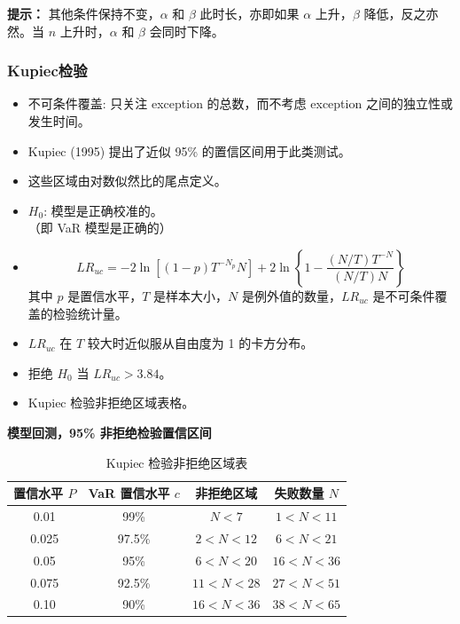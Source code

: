 \begin{itemize}
\textbf{提示：} 其他条件保持不变，\( \alpha \) 和 \( \beta \) 此时长，亦即如果 \( \alpha \) 上升，\( \beta \) 降低，反之亦然。当 \( n \) 上升时，\( \alpha \) 和 \( \beta \) 会同时下降。
    \end{itemize}

\subsubsection{Kupiec检验}
    \begin{itemize}
        \item 不可条件覆盖: 只关注 exception 的总数，而不考虑 exception 之间的独立性或发生时间。
        \item Kupiec (1995) 提出了近似 95\% 的置信区间用于此类测试。
        \item 这些区域由对数似然比的尾点定义。
        \item \( H_0 \): 模型是正确校准的。\\
        （即 VaR 模型是正确的）
        \item 
        \[
        LR_{uc} = -2\ln\left[(1 - p)T^{-N_p}N\right] + 2\ln\left\{1 - \frac{(N/T)T^{-N}}{(N/T)N}\right\}
        \]
        其中 \( p \) 是置信水平，\( T \) 是样本大小，\( N \) 是例外值的数量，\( LR_{uc} \) 是不可条件覆盖的检验统计量。
        \item \( LR_{uc} \) 在 \( T \) 较大时近似服从自由度为 1 的卡方分布。
        \item 拒绝 \( H_0 \) 当 \( LR_{uc} > 3.84 \)。
        \item Kupiec 检验非拒绝区域表格。
    \end{itemize}
    
    \textbf{模型回测，95\% 非拒绝检验置信区间}
    
    \begin{table}[h]
        \centering
        \begin{tabular}{|c|c|c|c|}
            \hline
            置信水平 \( P \) & VaR 置信水平 \( c \) & 非拒绝区域 & 失败数量 \( N \) \\
            \hline
            0.01 & 99\% & \( N < 7 \) & \( 1 < N < 11 \) \\
            \hline
            0.025 & 97.5\% & \( 2 < N < 12 \) & \( 6 < N < 21 \) \\
            \hline
            0.05 & 95\% & \( 6 < N < 20 \) & \( 16 < N < 36 \) \\
            \hline
            0.075 & 92.5\% & \( 11 < N < 28 \) & \( 27 < N < 51 \) \\
            \hline
            0.10 & 90\% & \( 16 < N < 36 \) & \( 38 < N < 65 \) \\
            \hline
        \end{tabular}
        \caption{Kupiec 检验非拒绝区域表}
    \end{table}
    

